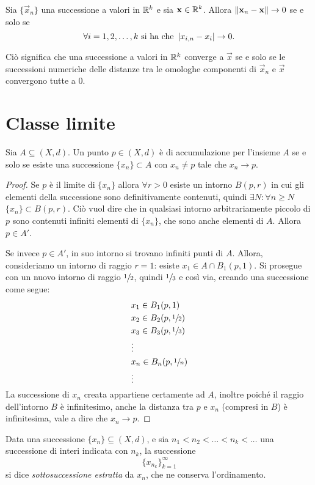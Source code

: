 \begin{teorema}
Sia $\{\vec x_n\}$ una successione a valori in $\mathbb{R}^k$ e sia $\mathbf{x}\in\mathbb{R}^k$. Allora $\left\|{\mathbf{x}_n-\mathbf{x}}\right\|\to 0$ se e solo se
\[
\forall i=1,2,\dots,k\text{ si ha che }\left|{x_{i,n}-x_i}\right|\to 0.
\]
\end{teorema}
Ciò significa che una successione a valori in $\mathbb{R}^k$ converge a $\vec x$ se e solo se le successioni numeriche delle distanze tra le omologhe componenti di $\vec x_n$ e $\vec x$ convergono tutte a 0.

\section{Classe limite}
\begin{lemma}
\label{l:pda_insieme}
Sia $A\subseteq (X,d)$. Un punto $p\in(X,d)$ è di accumulazione per l'insieme $A$ se e solo se esiste una successione $\{x_n\}\subset A$ con $x_n\neq p$ tale che $x_n\to p$.
\end{lemma}
\begin{proof}
Se $p$ è il limite di $\{x_n\}$ allora $\forall r>0$ esiste un intorno $B(p,r)$ in cui gli elementi della successione sono definitivamente contenuti, quindi $\exists N\colon\forall n\geq N$ $\{x_n\}\subset B(p,r)$. Ciò vuol dire che in qualsiasi intorno arbitrariamente piccolo di $p$ sono contenuti infiniti elementi di $\{x_n\}$, che sono anche elementi di $A$. Allora $p\in A'$.

Se invece $p\in A'$, in suo intorno si trovano infiniti punti di $A$. Allora, consideriamo un intorno di raggio $r=1$: esiste $x_1\in A\cap B_1(p,1)$. Si prosegue con un nuovo intorno di raggio $\sfrac{1}{2}$, quindi $\sfrac{1}{3}$ e così via, creando una successione come segue:
\begin{align*}
&x_1\in B_1(p,1)\\
&x_2\in B_2(p,\sfrac{1}{2})\\
&x_3\in B_3(p,\sfrac{1}{3})\\
&\vdots\\
&x_n\in B_n(p,\sfrac{1}{n})\\
&\vdots
\end{align*}
La successione di $x_n$ creata appartiene certamente ad $A$, inoltre poiché il raggio dell'intorno $B$ è infinitesimo, anche la distanza tra $p$ e $x_n$ (compresi in $B$) è infinitesima, vale a dire che $x_n\to p$.
\end{proof}
\begin{definizione}
\label{d:sottosuccessione}
Data una successione $\{x_n\}\subseteq(X,d)$, e sia $n_1<n_2<\dots<n_k<\dots$ una successione di interi indicata con $n_k$, la successione
\[
\big\{x_{n_k}\big\}_{k=1}^{\infty}
\]
si dice \emph{sottosuccessione estratta} da $x_n$, che ne conserva l'ordinamento.
\end{definizione}
